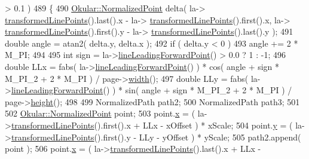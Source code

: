 \begin{DoxyCode}
      > 0.1 )
489                     \{
490                         \hyperlink{classOkular_1_1NormalizedPoint}{Okular::NormalizedPoint} delta( la->
      \hyperlink{classOkular_1_1LineAnnotation_a1e3b104d9572967e66f35a15c335f37c}{transformedLinePoints}().last().x - la->
      \hyperlink{classOkular_1_1LineAnnotation_a1e3b104d9572967e66f35a15c335f37c}{transformedLinePoints}().first().x, la->
      \hyperlink{classOkular_1_1LineAnnotation_a1e3b104d9572967e66f35a15c335f37c}{transformedLinePoints}().first().y - la->
      \hyperlink{classOkular_1_1LineAnnotation_a1e3b104d9572967e66f35a15c335f37c}{transformedLinePoints}().last().y );
491                         \textcolor{keywordtype}{double} angle = atan2( delta.y, delta.x );
492                         \textcolor{keywordflow}{if} ( delta.y < 0 )
493                             angle += 2 * M\_PI;
494 
495                         \textcolor{keywordtype}{int} sign = la->\hyperlink{classOkular_1_1LineAnnotation_a5ea35b2ee68172d9cf183d8778e34edb}{lineLeadingForwardPoint}() > 0.0 ? 1 : -1;
496                         \textcolor{keywordtype}{double} LLx = fabs( la->\hyperlink{classOkular_1_1LineAnnotation_a5ea35b2ee68172d9cf183d8778e34edb}{lineLeadingForwardPoint}() ) * cos( 
      angle + sign * M\_PI\_2 + 2 * M\_PI ) / page->\hyperlink{classOkular_1_1Page_a57114e88281da2a51b1bb0d5d4996d53}{width}();
497                         \textcolor{keywordtype}{double} LLy = fabs( la->\hyperlink{classOkular_1_1LineAnnotation_a5ea35b2ee68172d9cf183d8778e34edb}{lineLeadingForwardPoint}() ) * sin( 
      angle + sign * M\_PI\_2 + 2 * M\_PI ) / page->\hyperlink{classOkular_1_1Page_a67246a32b3e625946eb5c685b8372a4f}{height}();
498 
499                         NormalizedPath path2;
500                         NormalizedPath path3;
501 
502                         \hyperlink{classOkular_1_1NormalizedPoint}{Okular::NormalizedPoint} point;
503                         point.\hyperlink{classOkular_1_1NormalizedPoint_a857f49b9bc7712430d167472ef9dbd94}{x} = ( la->\hyperlink{classOkular_1_1LineAnnotation_a1e3b104d9572967e66f35a15c335f37c}{transformedLinePoints}().first().x + LLx - 
      xOffset ) * xScale;
504                         point.\hyperlink{classOkular_1_1NormalizedPoint_ac2276daabda627d5f82bb1532c293047}{y} = ( la->\hyperlink{classOkular_1_1LineAnnotation_a1e3b104d9572967e66f35a15c335f37c}{transformedLinePoints}().first().y - LLy - 
      yOffset ) * yScale;
505                         path2.append( point );
506                         point.\hyperlink{classOkular_1_1NormalizedPoint_a857f49b9bc7712430d167472ef9dbd94}{x} = ( la->\hyperlink{classOkular_1_1LineAnnotation_a1e3b104d9572967e66f35a15c335f37c}{transformedLinePoints}().last().x + LLx - 

\end{DoxyCode}
